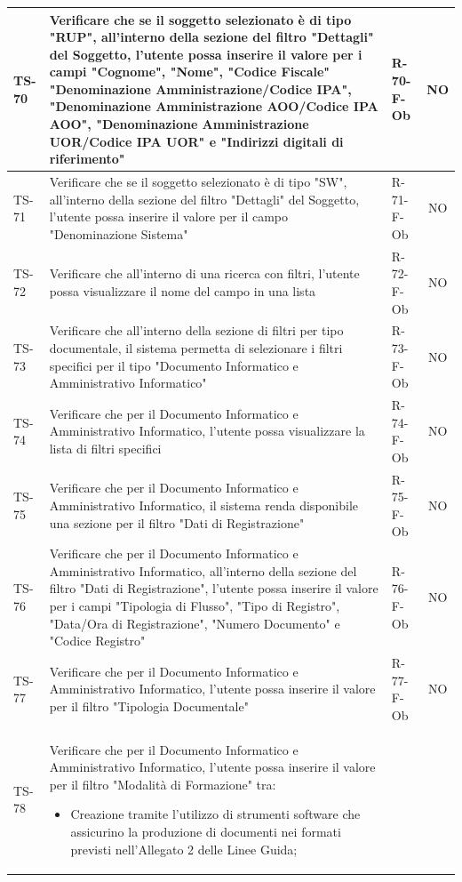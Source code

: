 \documentclass[a4paper,12pt]{article}
\begin{document}
\begin{longtable}{|p{1.5cm}|p{8.3cm}|p{2.4cm}|c|}
\hline
TS-70 & Verificare che se il soggetto selezionato è di tipo "RUP", all'interno della sezione del filtro "Dettagli" del Soggetto, l'utente possa inserire il valore per i campi "Cognome", "Nome", "Codice Fiscale" "Denominazione Amministrazione/Codice IPA", "Denominazione Amministrazione AOO/Codice IPA AOO", "Denominazione Amministrazione UOR/Codice IPA UOR" e "Indirizzi digitali di riferimento" & R-70-F-Ob & NO \\
\hline
TS-71 & Verificare che se il soggetto selezionato è di tipo "SW", all'interno della sezione del filtro "Dettagli" del Soggetto, l'utente possa inserire il valore per il campo "Denominazione Sistema" & R-71-F-Ob & NO \\
\hline
TS-72 & Verificare che all'interno di una ricerca con filtri, l'utente possa visualizzare il nome del campo in una lista & R-72-F-Ob & NO \\
\hline
TS-73 & Verificare che all'interno della sezione di filtri per tipo documentale, il sistema permetta di selezionare i filtri specifici per il tipo "Documento Informatico e Amministrativo Informatico" & R-73-F-Ob & NO \\
\hline
TS-74 & Verificare che per il Documento Informatico e Amministrativo Informatico, l'utente possa visualizzare la lista di filtri specifici & R-74-F-Ob & NO \\
\hline
TS-75 & Verificare che per il Documento Informatico e Amministrativo Informatico, il sistema renda disponibile una sezione per il filtro "Dati di Registrazione" & R-75-F-Ob & NO \\
\hline
TS-76 & Verificare che per il Documento Informatico e Amministrativo Informatico, all'interno della sezione del filtro "Dati di Registrazione", l'utente possa inserire il valore per i campi "Tipologia di Flusso", "Tipo di Registro", "Data/Ora di Registrazione", "Numero Documento" e "Codice Registro" & R-76-F-Ob & NO \\
\hline
TS-77 & Verificare che per il Documento Informatico e Amministrativo Informatico, l'utente possa inserire il valore per il filtro "Tipologia Documentale" & R-77-F-Ob & NO \\
\hline
TS-78 & Verificare che per il Documento Informatico e Amministrativo Informatico, l'utente possa inserire il valore per il filtro "Modalità di Formazione" tra:
\begin{itemize}
    \item Creazione tramite l'utilizzo di strumenti software che assicurino la produzione di documenti nei formati previsti nell'Allegato 2 delle Linee Guida;

\end{itemize}
\end{longtable}
\end{document}
